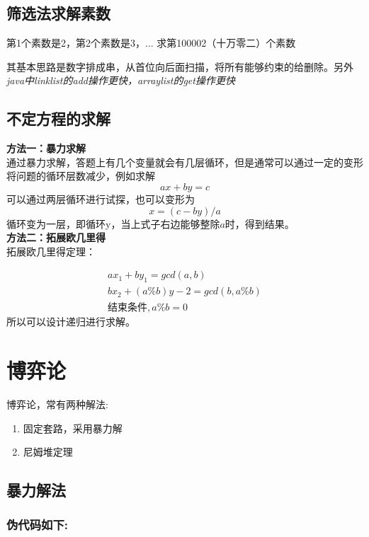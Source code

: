 \documentclass[a4paper]{article}
\begin{document}
	\subsection{筛选法求解素数}
	
	第1个素数是2，第2个素数是3，...
	求第100002（十万零二）个素数
	
	其基本思路是数字排成串，从首位向后面扫描，将所有能够约束的给删除。另外\textit{java中linklist的add操作更快，arraylist的get操作更快}
	
	
	\subsection{不定方程的求解}
	\textbf{方法一：暴力求解} \\
	通过暴力求解，答题上有几个变量就会有几层循环，但是通常可以通过一定的变形将问题的循环层数减少，例如求解
	\begin{displaymath}
		ax+by=c
	\end{displaymath}
	可以通过两层循环进行试探，也可以变形为
	\begin{displaymath}
		x = (c-by)/a
	\end{displaymath}
	循环变为一层，即循环y，当上式子右边能够整除$a$时，得到结果。\\
	\textbf{方法二：拓展欧几里得}\\
	拓展欧几里得定理：

	\begin{gather*}
		ax_1+by_1=gcd(a,b) \\
		bx_2+(a\%b)y-2=gcd(b,a\%b)		\\
		\text{结束条件},a\%b = 0
	\end{gather*}
	所以可以设计递归进行求解。
	
	
	\section{博弈论}
	博弈论，常有两种解法:
	\begin{enumerate}
		\item 固定套路，采用暴力解
		\item 尼姆堆定理
	\end{enumerate}
	\subsection{暴力解法}
	
	\subsubsection{伪代码如下:}
	
\end{document}
